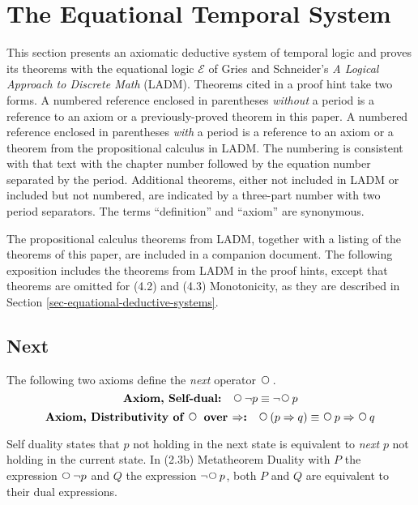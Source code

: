 \documentclass[12pt, fleqn, leqno]{article}
\newcommand{\impl}{\ensuremath{\Rightarrow}}        %
\newcommand{\Next}{\;\,\text{\raisebox{3.5pt}{\circle{6}}}}
\begin{document}
\section{The Equational Temporal System}

This section presents an axiomatic deductive system of temporal logic and proves its theorems with the equational
logic $\mathcal{E}$ of Gries and Schneider's \textit{A Logical Approach to Discrete Math} (LADM). \cite{LADM}
Theorems cited in a proof hint take two forms.
A numbered reference enclosed in parentheses \textit{without} a period is a reference to an axiom or a previously-proved
theorem in this paper.
A numbered reference enclosed in parentheses \textit{with} a period is a reference to an axiom or a
theorem from the propositional calculus in LADM.
The numbering is consistent with that text with the chapter number followed by the equation number separated by the period.
Additional theorems, either not included in LADM or included but not numbered, are indicated by a three-part number with two period separators.
The terms ``definition'' and ``axiom'' are synonymous.

The propositional calculus theorems from LADM, together with a listing of the theorems of this paper, are included in a companion document. \cite{vegaTheorems}
The following exposition includes the theorems from LADM in the proof hints, except that theorems are omitted for (4.2) and (4.3) Monotonicity, as they are described in Section \ref{sec-equational-deductive-systems}.

\subsection{Next}\label{section-next}

The following two axioms define the \textit{next} operator $\Next$.
\begin{equation}\label{E:selfDual}
\textbf{Axiom, Self-dual:}\quad \Next\neg p \equiv \neg\Next p
\end{equation}
\begin{equation}\label{E:distNextImp}
\textbf{Axiom, Distributivity of $\Next$ over $\impl$:}\quad \Next (p \impl q) \equiv \Next p \impl \Next q
\end{equation}

Self duality states that $p$ not holding in the next state is equivalent to \textit{next} $p$ not holding in the current state.
In (2.3b) Metatheorem Duality with $P$ the expression $\Next\neg p$ and $Q$ the expression $\neg\Next p$, both $P$ and $Q$ are equivalent to their dual expressions.
\end{document}
